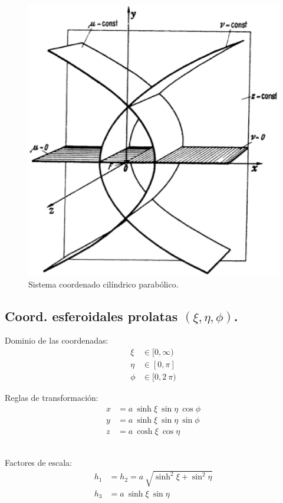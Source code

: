 \documentclass[12pt]{article}
\numberwithin{equation}{section}
\begin{document}
\begin{figure}[H]
  \centering
  \includegraphics[scale=0.5]{Imagenes/Sistema_Cilindrico_Parabolico.eps}
  \caption{Sistema coordenado cilíndrico parabólico.}
\end{figure}

\subsection{Coord. esferoidales prolatas \texorpdfstring{$(\xi, \eta, \phi)$}{x,e,f}.}

\begin{minipage}{0.45\textwidth}
Dominio de las coordenadas:
\begin{align*}
\xi &\in [0, \infty) \\
\eta &\in [0, \pi] \\
\phi &\in [0, 2 \: \pi)
\end{align*}
\end{minipage}
\hspace{1cm}
\begin{minipage}{0.4\textwidth}
Reglas de transformación:
\begin{align*}
x &= a \: \sinh \xi \: \sin \eta \: \cos \phi\\
y &= a \: \sinh \xi \: \sin \eta \: \sin \phi\\
z &= a \: \cosh \xi \: \cos \eta
\end{align*}
\end{minipage}
\\[0.75em]
Factores de escala:
\begin{align*}
h_{1} &= h_{2} = a \: \sqrt{\sinh^{2} \xi + \sin^{2} \eta} \\
h_{3 }&= a \: \sinh \xi \: \sin \eta
\end{align*}
\end{document}
